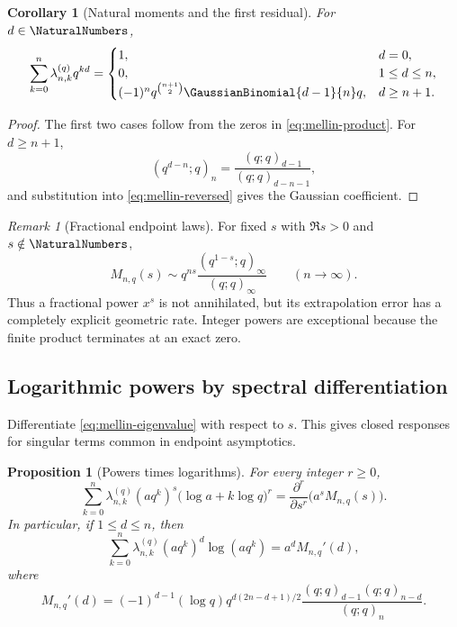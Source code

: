 \documentclass[11pt,a4paper,oneside]{article}
\newtheorem{proposition}[proposition]{Proposition}
\newtheorem{corollary}[corollary]{Corollary}
\theoremstyle{definition}
\theoremstyle{remark}
\newtheorem{remark}[remark]{Remark}
\begin{document}
\begin{corollary}[Natural moments and the first residual]
\label{cor:integer-moments}
For $d\in\NaturalNumbers$,
\begin{equation}
 \sum_{k=0}^n\lambda_{n,k}^{(q)}q^{kd}
 =\begin{cases}
 1,&d=0,\\
 0,&1\le d\le n,\\
 (-1)^nq^{\binom{n+1}{2}}\GaussianBinomial{d-1}{n}q,&d\ge n+1.
 \end{cases}
 \label{eq:integer-moment-law}
\end{equation}
\end{corollary}

\begin{proof}
The first two cases follow from the zeros in
\eqref{eq:mellin-product}.  For $d\ge n+1$,
\[
 (q^{d-n};q)_n=\frac{(q;q)_{d-1}}{(q;q)_{d-n-1}},
\]
and substitution into \eqref{eq:mellin-reversed} gives the Gaussian
coefficient.
\end{proof}

\begin{remark}[Fractional endpoint laws]
For fixed $s$ with $\Re s>0$ and $s\notin\NaturalNumbers$,
\begin{equation}
 M_{n,q}(s)
 \sim q^{ns}\frac{(q^{1-s};q)_\infty}{(q;q)_\infty}
 \qquad(n\to\infty).
 \label{eq:fractional-asymptotic}
\end{equation}
Thus a fractional power $x^s$ is not annihilated, but its extrapolation error
has a completely explicit geometric rate.  Integer powers are exceptional
because the finite product terminates at an exact zero.
\end{remark}

\subsection{Logarithmic powers by spectral differentiation}

Differentiate \eqref{eq:mellin-eigenvalue} with respect to $s$.  This gives
closed responses for singular terms common in endpoint asymptotics.

\begin{proposition}[Powers times logarithms]
\label{prop:log-powers}
For every integer $r\ge0$,
\begin{equation}
 \sum_{k=0}^n\lambda_{n,k}^{(q)}(aq^k)^s
 \bigl(\log a+k\log q\bigr)^r
 =\frac{\partial^r}{\partial s^r}\bigl(a^sM_{n,q}(s)\bigr).
 \label{eq:log-power-response}
\end{equation}
In particular, if $1\le d\le n$, then
\begin{equation}
 \sum_{k=0}^n\lambda_{n,k}^{(q)}(aq^k)^d\log(aq^k)
 =a^dM_{n,q}'(d),
 \label{eq:first-log-response}
\end{equation}
where
\begin{equation}
 M_{n,q}'(d)
 =(-1)^{d-1}(\log q)
 q^{d(2n-d+1)/2}
 \frac{(q;q)_{d-1}(q;q)_{n-d}}{(q;q)_n}.
 \label{eq:mellin-derivative-integer}
\end{equation}
\end{proposition}
\end{document}
